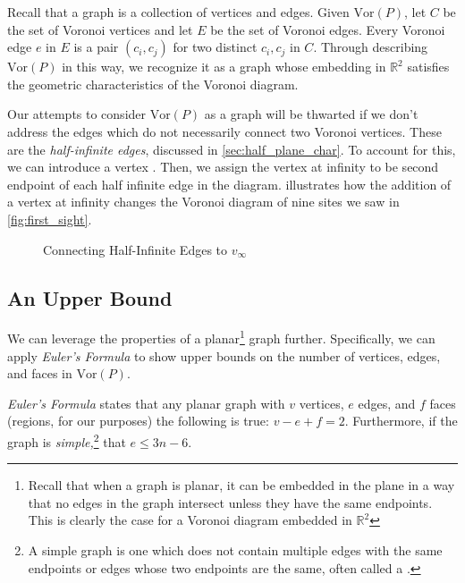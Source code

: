 \documentclass[12pt,twoside]{reedthesis}
\begin{document}
      Recall that a graph is a collection of vertices and edges. Given $\mbox{Vor}(P)$, let $C$ be the set of Voronoi vertices and let $E$ be the set of Voronoi edges. Every Voronoi edge $e$ in $E$ is a pair $(c_{i}, c_{j})$ for two distinct $c_{i}, c_{j}$  in $C$. Through describing $\mbox{Vor}(P)$ in this way, we recognize it as a graph whose embedding in $\mathds{R}^2$ satisfies the geometric characteristics of the Voronoi diagram.\par

      Our attempts to consider $\mbox{Vor}(P)$ as a graph will be thwarted if we don't address the edges which do not necessarily connect two Voronoi vertices. These are the \emph{half-infinite edges}, discussed in \cref{sec:half_plane_char}. To account for this, we can introduce a vertex . Then, we assign the vertex at infinity to be second endpoint of each half infinite edge in the diagram.  illustrates how the addition of a vertex at infinity changes the Voronoi diagram of nine sites we saw in \cref{fig:first_sight}.\par

      \begin{figure}[!htb]
        \centering
        
        \caption{Connecting Half-Infinite Edges to $v_{\infty}$}
        \label{fig:vertex_at_infinity}
      \end{figure}



    \subsection{An Upper Bound} %
    \label{sub:an_upper_bound}

      We can leverage the properties of a planar\footnote{Recall that when a graph is planar, it can be embedded in the plane in a way that no edges in the graph intersect unless they have the same endpoints. This is clearly the case for a Voronoi diagram embedded in $\mathds{R}^2$} graph further. Specifically, we can apply \emph{Euler's Formula} to show upper bounds on the number of vertices, edges, and faces in $\mbox{Vor}(P)$. 

      \emph{Euler's Formula} states that any planar graph with $v$ vertices, $e$ edges, and $f$ faces (regions, for our purposes) the following is true: $v - e + f = 2.$ Furthermore, if the graph is \emph{simple,}\footnote{A simple graph is one which does not contain multiple edges with the same endpoints or edges whose two endpoints are the same, often called a .} that $e \leq 3n -6$.\par
\end{document}
